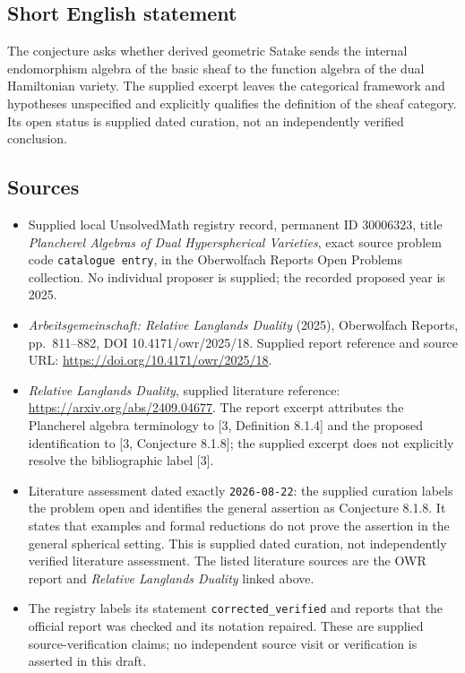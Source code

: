 \documentclass[11pt]{article}
\begin{document}
\subsection{Short English statement}
The conjecture asks whether derived geometric Satake sends the internal endomorphism algebra of the basic sheaf to the function algebra of the dual Hamiltonian variety. The supplied excerpt leaves the categorical framework and hypotheses unspecified and explicitly qualifies the definition of the sheaf category. Its open status is supplied dated curation, not an independently verified conclusion.
\subsection{Sources}
\begin{itemize}
\item Supplied local UnsolvedMath registry record, permanent ID \(30006323\), title \emph{Plancherel Algebras of Dual Hyperspherical Varieties}, exact source problem code \texttt{catalogue entry}, in the Oberwolfach Reports Open Problems collection. No individual proposer is supplied; the recorded proposed year is 2025.
\item \emph{Arbeitsgemeinschaft: Relative Langlands Duality} (2025), Oberwolfach Reports, pp.\ 811--882, DOI 10.4171/owr/2025/18. Supplied report reference and source URL: \url{https://doi.org/10.4171/owr/2025/18}.
\item \emph{Relative Langlands Duality}, supplied literature reference: \url{https://arxiv.org/abs/2409.04677}. The report excerpt attributes the Plancherel algebra terminology to [3, Definition 8.1.4] and the proposed identification to [3, Conjecture 8.1.8]; the supplied excerpt does not explicitly resolve the bibliographic label [3].
\item Literature assessment dated exactly \texttt{2026-08-22}: the supplied curation labels the problem open and identifies the general assertion as Conjecture 8.1.8. It states that examples and formal reductions do not prove the assertion in the general spherical setting. This is supplied dated curation, not independently verified literature assessment. The listed literature sources are the OWR report and \emph{Relative Langlands Duality} linked above.
\item The registry labels its statement \texttt{corrected\_verified} and reports that the official report was checked and its notation repaired. These are supplied source-verification claims; no independent source visit or verification is asserted in this draft.
\end{itemize}
\end{document}
